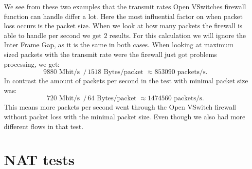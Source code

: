 \documentclass[11pt,a4paper,twoside,openright,bachelor,english]{netthesis}
\begin{document}
We see from these two examples that the transmit rates Open VSwitches firewall function can handle differ a lot. Here the most influential factor on when packet loss occurs is the packet size. When we look at how many packets the firewall is able to handle per second we get 2 results. For this calculation we will ignore the Inter Frame Gap, as it is the same in both cases. When looking at maximum sized packets with the transmit rate were the firewall just got problems processing, we get: $$ 9880  \text{ Mbit/s } \, / \, 1518 \text{ Bytes/packet }  \approx 853090 \text{ packets/s. } $$
In contrast the amount of packets per second in the test with minimal packet size was: $$ 720  \text{ Mbit/s } \, / \, 64 \text{ Bytes/packet }  \approx 1474560 \text{ packets/s. }$$
This means more packets per second went through the Open VSwitch firewall without packet loss with the minimal packet size. Even though we also had more different flows in that test. 

\section{NAT tests}
\end{document}
